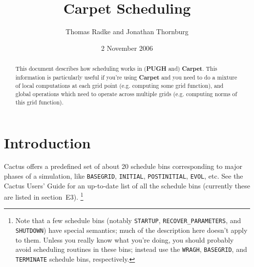 \documentclass{article}
\def\thorn#1{\textbf{#1}}
\def\eg{e.g.\hbox{}}
\begin{document}
\author{Thomas Radke and Jonathan Thornburg}
\title{Carpet Scheduling}
\date{2 November 2006}
\maketitle
\begin{abstract}
This document describes how scheduling works in (\thorn{PUGH} and)
\thorn{Carpet}.  This information is particularly useful if you're
using \thorn{Carpet} and you need to do a mixture of local computations
at each grid point (\eg{} computing some grid function), and global
operations which need to operate across multiple grids (\eg{} computing
norms of this grid function).
\end{abstract}


\section{Introduction}

Cactus offers a predefined set of about 20 schedule bins corresponding
to major phases of a simulation, like \verb|BASEGRID|, \verb|INITIAL|,
\verb|POSTINITIAL|, \verb|EVOL|, etc.  See the Cactus Users' Guide for
an up-to-date list of all the schedule bins (currently these are listed
in section~E3).%
\footnote{%
	 Note that a few schedule bins (notably \texttt{STARTUP},
	 \texttt{RECOVER\_PARAMETERS}, and \texttt{SHUTDOWN}) have
	 special semantics; much of the description here doesn't
	 apply to them.  Unless you really know what you're doing,
	 you should probably avoid scheduling routines in these
	 bins; instead use the \texttt{WRAGH}, \texttt{BASEGRID},
	 and \texttt{TERMINATE} schedule bins, respectively.
	 }%
\end{document}
